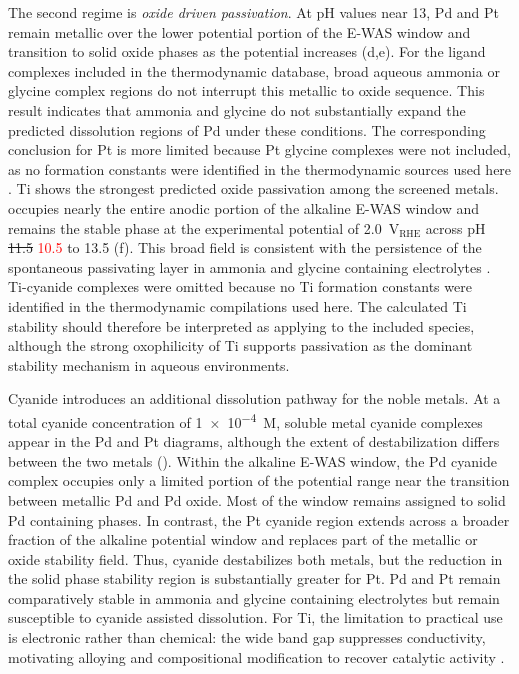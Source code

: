 \documentclass[twoside,twocolumn,9pt]{article}
\begin{document}
The second regime is \emph{oxide driven passivation}. At pH values near 13, Pd and Pt remain metallic over the lower potential portion of the E-WAS window and transition to solid oxide phases as the potential increases (d,e). For the ligand complexes included in the thermodynamic database, broad aqueous ammonia or glycine complex regions do not interrupt this metallic to oxide sequence. This result indicates that ammonia and glycine do not substantially expand the predicted dissolution regions of Pd under these conditions. The corresponding conclusion for Pt is more limited because Pt glycine complexes were not included, as no formation constants were identified in the thermodynamic sources used here \cite{Smith1989CriticalConstants}. Ti shows the strongest predicted oxide passivation among the screened metals.  occupies nearly the entire anodic portion of the alkaline E-WAS window and remains the stable phase at the experimental potential of 2.0~V$_{\mathrm{RHE}}$ across pH \sout{11.5} \textcolor{red}{10.5} to 13.5 (f). This broad  field is consistent with the persistence of the spontaneous passivating layer in ammonia and glycine containing electrolytes \cite{Kiss1991CriticalGlycine,Knauss2001TiIV300C,Schmidt2006DissolutionEffect,Pocsi1988ComplexAcid}. Ti-cyanide complexes were omitted because no Ti  formation constants were identified in the thermodynamic compilations used here. The calculated Ti stability should therefore be interpreted as applying to the included species, although the strong oxophilicity of Ti supports  passivation as the dominant stability mechanism in aqueous environments.



Cyanide introduces an additional dissolution pathway for the noble metals. At a total cyanide concentration of \SI{1e-4}{M}, soluble metal cyanide complexes appear in the Pd and Pt diagrams, although the extent of destabilization differs between the two metals (). Within the alkaline E-WAS window, the Pd cyanide complex occupies only a limited portion of the potential range near the transition between metallic Pd and Pd oxide. Most of the window remains assigned to solid Pd containing phases. In contrast, the Pt cyanide region extends across a broader fraction of the alkaline potential window and replaces part of the metallic or oxide stability field. Thus, cyanide destabilizes both metals, but the reduction in the solid phase stability region is substantially greater for Pt. Pd and Pt remain comparatively stable in ammonia and glycine containing electrolytes but remain susceptible to cyanide assisted dissolution. For Ti, the limitation to practical use is electronic rather than chemical: the wide  band gap suppresses conductivity, motivating alloying and compositional modification to recover catalytic activity \cite{Gardon2013ImprovedSpray,Hui2022VacancyBatteries}.
\end{document}
